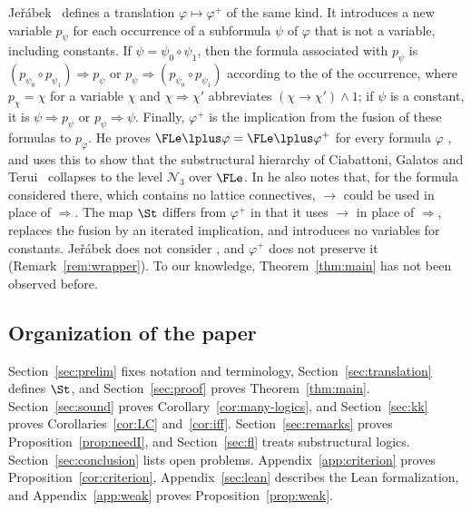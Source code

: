 Jeřábek~\cite[Def.~3.6]{Jer16} defines a translation
$\varphi\mapsto\varphi^+$ of the same kind. It introduces a new variable
$p_\psi$ for each occurrence of a subformula $\psi$ of $\varphi$ that is
not a variable, including constants. If $\psi=\psi_0\circ\psi_1$, then
the formula associated with $p_\psi$ is
$(p_{\psi_0}\circ p_{\psi_1})\Rightarrow p_\psi$ or
$p_\psi\Rightarrow(p_{\psi_0}\circ p_{\psi_1})$ according to the
 of the occurrence, where $p_\chi=\chi$ for a variable $\chi$
and $\chi\Rightarrow\chi'$ abbreviates $(\chi\to\chi')\wedge1$; if $\psi$
is a constant, it is $\psi\Rightarrow p_\psi$ or $p_\psi\Rightarrow\psi$.
Finally,
$\varphi^+$ is the implication from the fusion of these formulas to
$p_\varphi$. He proves $\FLe\lplus\varphi=\FLe\lplus\varphi^+$ for every
formula $\varphi$ \cite[Thm.~3.8]{Jer16}, and uses this to show that the
substructural hierarchy of Ciabattoni, Galatos and Terui~\cite{CGT08}
collapses to the level $\mathcal N_3$ over $\FLe$. In
\cite[Example~3.9]{Jer16} he also notes that, for the formula considered
there, which contains no lattice connectives, $\to$ could be used in place
of $\Rightarrow$. The map $\St$ differs from $\varphi^+$ in that it uses
$\to$ in place of $\Rightarrow$, replaces the fusion by an iterated
implication, and introduces no variables for constants. Jeřábek does not
consider , and $\varphi^+$ does not preserve it
(Remark~\ref{rem:wrapper}). To our knowledge, Theorem~\ref{thm:main} has
not been observed before.

\subsection{Organization of the paper}

Section~\ref{sec:prelim} fixes notation and terminology,
Section~\ref{sec:translation} defines $\St$, and
Section~\ref{sec:proof} proves Theorem~\ref{thm:main}.
Section~\ref{sec:sound} proves Corollary~\ref{cor:many-logics}, and
Section~\ref{sec:kk} proves Corollaries~\ref{cor:LC} and~\ref{cor:iff}.
Section~\ref{sec:remarks} proves Proposition~\ref{prop:needI}, and
Section~\ref{sec:fl} treats substructural logics.
Section~\ref{sec:conclusion} lists open problems.
Appendix~\ref{app:criterion} proves Proposition~\ref{cor:criterion},
Appendix~\ref{sec:lean} describes the Lean formalization, and
Appendix~\ref{app:weak} proves Proposition~\ref{prop:weak}.
